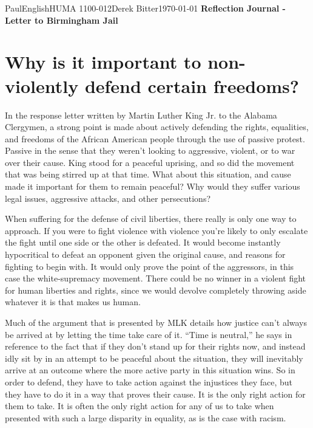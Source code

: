 \documentclass[12pt,letterpaper]{article}
\begin{document}
\begin{mla}{Paul}{English}{HUMA 1100-012}{Derek
    Bitter}{\today}    
    {\textbf{Reflection Journal - Letter to Birmingham Jail}}

\section*{Why is it important to non-violently defend certain freedoms?}

In the response letter written by Martin Luther King Jr. to the Alabama Clergymen, a strong point is made about actively defending the rights, equalities, and freedoms of the African American people through the use of passive protest. Passive in the sense that they weren't looking to aggressive, violent, or to war over their cause. King stood for a peaceful uprising, and so did the movement that was being stirred up at that time. What about this situation, and cause made it important for them to remain peaceful? Why would they suffer various legal issues, aggressive attacks, and other persecutions?

When suffering for the defense of civil liberties, there really is only one way to approach. If you were to fight violence with violence you're likely to only escalate the fight until one side or the other is defeated. It would become instantly hypocritical to defeat an opponent given the original cause, and reasons for fighting to begin with. It would only prove the point of the aggressors, in this case the white-supremacy movement. There could be no winner in a violent fight for human liberties and rights, since we would devolve completely throwing aside whatever it is that makes us human.

Much of the argument that is presented by MLK details how justice can't always be arrived at by letting the time take care of it. 	``Time is neutral,'' he says in reference to the fact that if they don't stand up for their rights now, and instead idly sit by in an attempt to be peaceful about the situation, they will inevitably arrive at an outcome where the more active party in this situation wins. So in order to defend, they have to take action against the injustices they face, but they have to do it in a way that proves their cause. It is the only right action for them to take. It is often the only right action for any of us to take when presented with such a large disparity in equality, as is the case with racism.


\end{mla}
\end{document}
